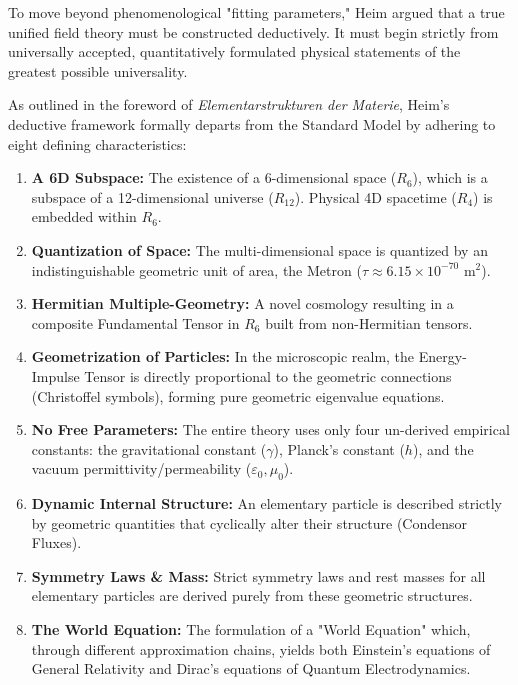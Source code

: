 \documentclass[11pt,a4paper,oneside]{article}
\begin{document}
To move beyond phenomenological "fitting parameters," Heim argued that a true unified field theory must be constructed deductively. It must begin strictly from universally accepted, quantitatively formulated physical statements of the greatest possible universality. 

\begin{tcolorbox}[colback=white, colframe=theoryblue, title=\textbf{The 8 Core Postulates of Heim Theory}]
As outlined in the foreword of \textit{Elementarstrukturen der Materie}, Heim’s deductive framework formally departs from the Standard Model by adhering to eight defining characteristics:
\begin{enumerate}[itemsep=2pt, leftmargin=*]
    \item \textbf{A 6D Subspace:} The existence of a 6-dimensional space ($R_6$), which is a subspace of a 12-dimensional universe ($R_{12}$). Physical 4D spacetime ($R_4$) is embedded within $R_6$.
    \item \textbf{Quantization of Space:} The multi-dimensional space is quantized by an indistinguishable geometric unit of area, the Metron ($\tau \approx 6.15 \times 10^{-70} \text{ m}^2$).
    \item \textbf{Hermitian Multiple-Geometry:} A novel cosmology resulting in a composite Fundamental Tensor in $R_6$ built from non-Hermitian tensors.
    \item \textbf{Geometrization of Particles:} In the microscopic realm, the Energy-Impulse Tensor is directly proportional to the geometric connections (Christoffel symbols), forming pure geometric eigenvalue equations.
    \item \textbf{No Free Parameters:} The entire theory uses only four un-derived empirical constants: the gravitational constant ($\gamma$), Planck's constant ($h$), and the vacuum permittivity/permeability ($\varepsilon_0, \mu_0$).
    \item \textbf{Dynamic Internal Structure:} An elementary particle is described strictly by geometric quantities that cyclically alter their structure (Condensor Fluxes).
    \item \textbf{Symmetry Laws \& Mass:} Strict symmetry laws and rest masses for all elementary particles are derived purely from these geometric structures.
    \item \textbf{The World Equation:} The formulation of a "World Equation" which, through different approximation chains, yields both Einstein's equations of General Relativity and Dirac's equations of Quantum Electrodynamics.
\end{enumerate}
\end{tcolorbox}
\end{document}

